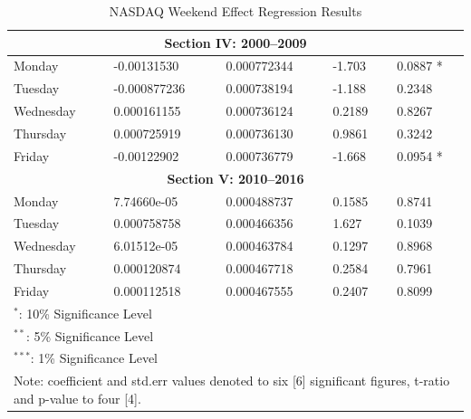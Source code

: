 \documentclass[11pt, english]{article}
\begin{document}
\begin{table}[h]
\begin{center}
\begin{tabular}{p{2cm}p{2cm}p{2cm}p{2cm}p{2cm}}
                \hline                                             
                \multicolumn{5}{c}{\textbf{Section IV: 2000--2009}}\\
                \hline            
                Monday & -0.00131530 & 0.000772344 & -1.703 & 0.0887 *\\   
                Tuesday & -0.000877236 & 0.000738194 & -1.188 & 0.2348\\  
                Wednesday & 0.000161155 & 0.000736124 & 0.2189 & 0.8267\\
                Thursday & 0.000725919 & 0.000736130 & 0.9861 & 0.3242\\
                Friday & -0.00122902 & 0.000736779 & -1.668 & 0.0954 *\\  
                \hline                                             
                \multicolumn{5}{c}{\textbf{Section V: 2010--2016}}\\
                \hline
                Monday & 7.74660e-05 & 0.000488737 & 0.1585 & 0.8741\\ 
                Tuesday & 0.000758758 & 0.000466356 & 1.627 & 0.1039\\  
                Wednesday & 6.01512e-05 & 0.000463784 & 0.1297 & 0.8968\\
                Thursday & 0.000120874 & 0.000467718 & 0.2584 & 0.7961\\
                Friday & 0.000112518 & 0.000467555 & 0.2407 & 0.8099\\ 
                \hline
                \multicolumn{5}{l}{$^*$: 10\% Significance Level}\\
                \multicolumn{5}{l}{$^{**}$: 5\% Significance Level}\\
                \multicolumn{5}{l}{$^{***}$: 1\% Significance Level}\\
                \hline
		\multicolumn{5}{p{11.5cm}}{Note: coefficient and std.err values denoted to six [6] significant figures, t-ratio and p-value to four [4].}\\
                \hline
        \end{tabular}
                \caption{NASDAQ Weekend Effect Regression Results}
        \end{center}
        \end{table}
\end{document}
